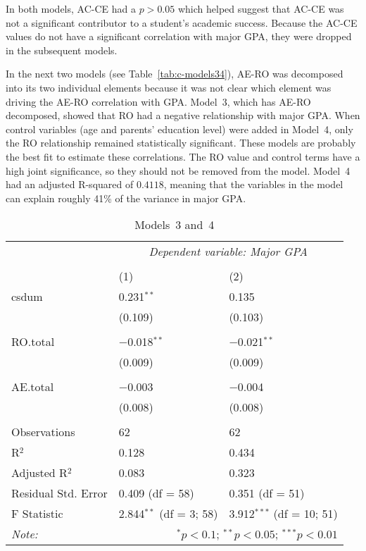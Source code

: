 In both models, AC-CE had a $p>0.05$ which helped suggest that AC-CE was not a significant contributor to a student's academic success. Because the AC-CE values do not have a significant correlation with major GPA, they were dropped in the subsequent models.

In the next two models (see Table~\ref{tab:c-models34}), AE-RO was decomposed into its two individual elements because it was not clear which element was driving the AE-RO correlation with GPA. Model~3, which has AE-RO decomposed, showed that RO had a negative relationship with major GPA. When control variables (age and parents' education level) were added in Model~4, only the RO relationship remained statistically significant. These models are probably the best fit to estimate these correlations. The RO value and control terms have a high joint significance, so they should not be removed from the model. Model~4 had an adjusted R-squared of $0.4118$, meaning that the variables in the model can explain roughly 41\% of the variance in major GPA.

\begin{table}[!htbp] \centering
  \centering
  \caption{Models~3 and~4}
  \label{tab:models34}
  \begin{tabular}{@{\extracolsep{5pt}}lll}
    \toprule
     & \multicolumn{2}{c}{\textit{Dependent variable: Major GPA}} \\
    \cmidrule{2-3}
    \\[-1.8ex] & (1) & (2)\\
    \midrule
    csdum & 0.231$^{**}$ & 0.135 \\
      & (0.109) & (0.103) \\
      & & \\
    RO.total & $-$0.018$^{**}$ & $-$0.021$^{**}$ \\
      & (0.009) & (0.009) \\
      & & \\
    AE.total & $-$0.003 & $-$0.004 \\
      & (0.008) & (0.008) \\
      & & \\
    \midrule
    Observations & 62 & 62 \\
    R$^{2}$ & 0.128 & 0.434 \\
    Adjusted R$^{2}$ & 0.083 & 0.323 \\
    Residual Std. Error & 0.409 (df = 58) & 0.351 (df = 51) \\
    F Statistic & 2.844$^{**}$ (df = 3; 58) & 3.912$^{***}$ (df = 10; 51) \\
    \bottomrule
    \textit{Note:}  & \multicolumn{2}{r}{$^{*}p<0.1$; $^{**}p<0.05$; $^{***}p<0.01$} \\
  \end{tabular}
\end{table}

